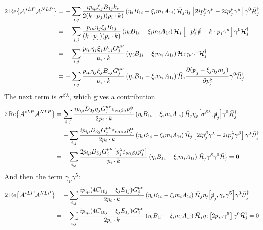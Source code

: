 \documentclass{article}
\newcommand{\s}[1]{\slashed #1}
\begin{document}
\begin{align*}
	2\Re{\mathcal{A}^{*LP}\mathcal{A}^{NLP}} &=-\sum_{i,j}\frac{ip_{i\mu}\xi_j B_{1j}k_\nu}{2(k\cdot p_j)(p_i\cdot k)}\left(\eta_iB_{1i}-\xi_im_iA_{1i}\right)\bar{\mathcal{H}}_j\eta_j\left[2ip_j^\mu\gamma^\nu-2ip_j^\nu\gamma^{\mu}\right]\gamma^0\bar{\mathcal{H}}^\dag_j\\&
	=-\sum_{i,j}\frac{p_{i\mu}\eta_j\xi_j B_{1j}}{(k\cdot p_j)(p_i\cdot k)}\left(\eta_iB_{1i}-\xi_im_iA_{1i}\right)\bar{\mathcal{H}}_j\left[-p_j^\mu\s{k}+k\cdot p_j\gamma^{\mu}\right]\gamma^0\bar{\mathcal{H}}^\dag_j\\&
	=-\sum_{i,j}\frac{p_{i\mu}\eta_j\xi_j B_{1j}G^{\mu\nu}_j}{p_i\cdot k}\left(\eta_iB_{1i}-\xi_im_iA_{1i}\right)\bar{\mathcal{H}}_j\gamma_\nu\gamma^0\bar{\mathcal{H}}^\dag_j\\&
	=-\sum_{i,j}\frac{p_{i\mu}\eta_j\xi_j B_{1j}G^{\mu\nu}_j}{p_i\cdot k}\left(\eta_iB_{1i}-\xi_im_iA_{1i}\right)\bar{\mathcal{H}}_j\pdv{(\s{p}_j-\xi_j\eta_j m_j)}{p_j^\nu}\gamma^0\bar{\mathcal{H}}^\dag_j
\end{align*}
The next term is $\sigma^{\beta\lambda}$, which gives a contribution
\begin{align*}
	2\Re{\mathcal{A}^{*LP}\mathcal{A}^{NLP}} &=\sum_{i,j}\frac{ip_{i\mu} D_{3j}\eta_jG_j^{\mu\nu}\varepsilon_{\nu\alpha\beta\lambda} p_j^\alpha}{2p_i\cdot k}\left(\eta_iB_{1i}-\xi_im_iA_{1i}\right)\bar{\mathcal{H}}_j\eta_j\comm{\sigma^{\beta\lambda}}{\s{p}_j}\gamma^0\bar{\mathcal{H}}^\dag_j\\&
	=-\sum_{i,j}\frac{ip_{i\mu} D_{3j}G_j^{\mu\nu}\varepsilon_{\nu\alpha\beta\lambda} p_j^\alpha}{2p_i\cdot k}\left(\eta_iB_{1i}-\xi_im_iA_{1i}\right)\bar{\mathcal{H}}_j\left[2ip^\beta_j\gamma^\lambda - 2i p^\lambda_j \gamma^\beta\right]\gamma^0\bar{\mathcal{H}}^\dag_j\\&
	=-\sum_{i,j}\frac{2p_{i\mu} D_{3j}G_j^{\mu\nu}\left[p^\lambda_j\varepsilon_{\nu\alpha\beta\lambda} p_j^\alpha\right]}{p_i\cdot k}\left(\eta_iB_{1i}-\xi_im_iA_{1i}\right)\bar{\mathcal{H}}_j \gamma^\beta\gamma^0\bar{\mathcal{H}}^\dag_j
	=0
\end{align*}
And then the term $\gamma_\nu \gamma^5$:
\begin{align*}
	2\Re{\mathcal{A}^{*LP}\mathcal{A}^{NLP}} &=-\sum_{i,j}\frac{ip_{i\mu}(4C_{10j}-\xi_j E_{1j})G_j^{\mu\nu}}{2p_i\cdot k}\left(\eta_iB_{1i}-\xi_im_iA_{1i}\right)\bar{\mathcal{H}}_j\eta_j\comm{\s{p}_j}{\gamma_\nu \gamma^5}\gamma^0\bar{\mathcal{H}}^\dag_j\\&
	=-\sum_{i,j}\frac{ip_{i\mu}(4C_{10j}-\xi_j E_{1j})G_j^{\mu\nu}}{2p_i\cdot k}\left(\eta_iB_{1i}-\xi_im_iA_{1i}\right)\bar{\mathcal{H}}_j\eta_j\left[2p_{j\nu}\gamma^5\right]\gamma^0\bar{\mathcal{H}}^\dag_j = 0
\end{align*}
\end{document}
